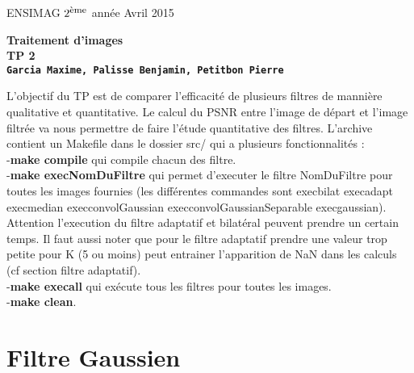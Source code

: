 \documentclass[12pt]{article}
\newcommand{\noi}{\noindent}
\numberwithin{equation}{section}
\begin{document}
\baselineskip7mm

\noi ENSIMAG $2^{\footnotesize \mbox{ème}}$ année   \hfill Avril 2015


\vspace{1cm}


\begin{center}
{\Large \bf Traitement d'images\\ TP 2\\ \texttt{Garcia Maxime, Palisse Benjamin, Petitbon Pierre}}
\end{center}

\vspace{5mm}

L'objectif du TP est de comparer l'efficacité de plusieurs filtres de mannière qualitative et quantitative. Le calcul du PSNR entre l'image de départ et l'image filtrée va nous permettre de faire l'étude quantitative des filtres. L'archive contient un Makefile dans le dossier src/ qui a plusieurs fonctionnalités : \\
-\textbf{make compile }qui compile chacun des filtre.\\
-\textbf{make execNomDuFiltre }qui permet d'executer le filtre NomDuFiltre pour toutes les images fournies
(les différentes commandes sont execbilat execadapt execmedian execconvolGaussian execconvolGaussianSeparable execgaussian). Attention l'execution du filtre adaptatif et bilatéral peuvent prendre un certain temps. Il faut aussi noter que pour le filtre adaptatif prendre une valeur trop petite pour K (5 ou moins) peut entrainer l'apparition de NaN dans les calculs (cf section filtre adaptatif).\\
-\textbf{make execall} qui exécute tous les filtres pour toutes les images.\\
-\textbf{make clean}.\\
\section{Filtre Gaussien}
\end{document}
